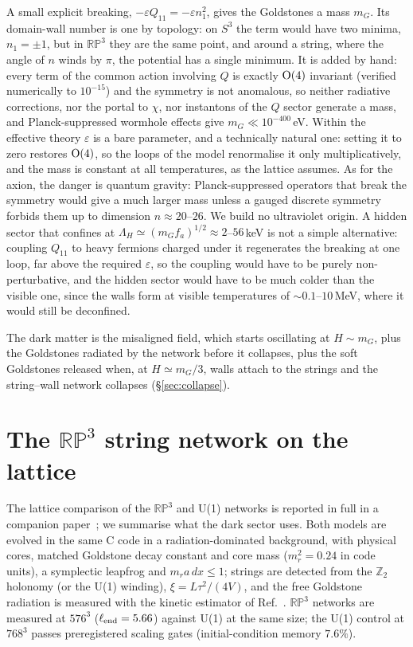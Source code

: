 \documentclass[11pt,a4paper]{article}
\newcommand{\RP}{\mathbb{RP}^3}
\newcommand{\Ztwo}{\mathbb{Z}_2}
\begin{document}
A small explicit breaking, $-\varepsilon Q_{11}=-\varepsilon n_1^2$, gives the Goldstones a mass $m_G$. Its domain-wall number is one by topology: on $S^3$ the term would have two minima, $n_1=\pm1$, but in $\RP$ they are the same point, and around a string, where the angle of $n$ winds by $\pi$, the potential has a single minimum.
It is added by hand: every term of the common action involving $Q$ is exactly ${\rm O}(4)$ invariant (verified numerically to $10^{-15}$) and the symmetry is not anomalous, so neither radiative corrections, nor the portal to $\chi$, nor instantons of the $Q$ sector generate a mass, and Planck-suppressed wormhole effects give $m_G\ll10^{-400}$\,eV.
Within the effective theory $\varepsilon$ is a bare parameter, and a technically natural one: setting it to zero restores ${\rm O}(4)$, so the loops of the model renormalise it only multiplicatively, and the mass is constant at all temperatures, as the lattice assumes. As for the axion, the danger is quantum gravity: Planck-suppressed operators that break the symmetry would give a much larger mass unless a gauged discrete symmetry forbids them up to dimension $n\approx20$--$26$. We build no ultraviolet origin. A hidden sector that confines at $\Lambda_H\simeq(m_Gf_a)^{1/2}\approx2$--$56$\,keV is not a simple alternative: coupling $Q_{11}$ to heavy fermions charged under it regenerates the breaking at one loop, far above the required $\varepsilon$, so the coupling would have to be purely non-perturbative, and the hidden sector would have to be much colder than the visible one, since the walls form at visible temperatures of $\sim0.1$--$10$\,MeV, where it would still be deconfined.

The dark matter is the misaligned field, which starts oscillating at $H\sim m_G$, plus the Goldstones radiated by the network before it collapses, plus the soft Goldstones released when, at $H\simeq m_G/3$, walls attach to the strings and the string--wall network collapses (\S\ref{sec:collapse}).

\section{The $\RP$ string network on the lattice}
\label{sec:network}

The lattice comparison of the $\RP$ and U(1) networks is reported in full in a companion paper~\cite{rp3_paper}; we summarise what the dark sector uses.
Both models are evolved in the same C code in a radiation-dominated background, with physical cores, matched Goldstone decay constant and core mass ($m_r^2=0.24$ in code units), a symplectic leapfrog and $m_r a\,dx\le1$; strings are detected from the $\Ztwo$ holonomy (or the U(1) winding), $\xi=L\tau^2/(4V)$, and the free Goldstone radiation is measured with the kinetic estimator of Ref.~\cite{GHV2018}.
$\RP$ networks are measured at $576^3$ ($\ell_{\rm end}=5.66$) against U(1) at the same size; the U(1) control at $768^3$ passes preregistered scaling gates (initial-condition memory $7.6\%$).
\end{document}
